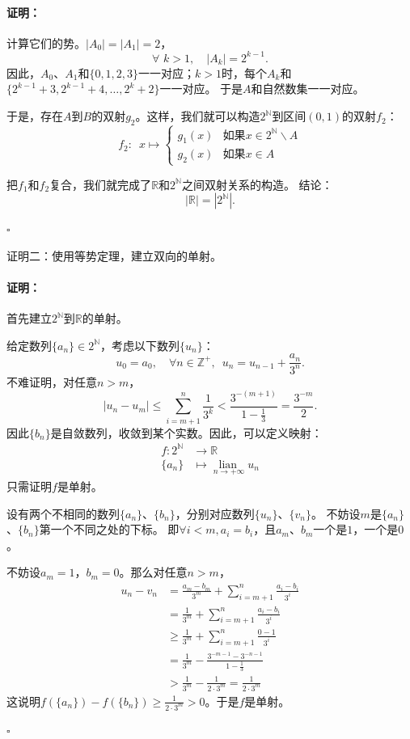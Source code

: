 \documentclass[12pt,UTF8]{ctexbook}
\newcommand{\lian}[1]{
    \underset{#1}{\operatorname{lian}\,}
}
\renewenvironment{proof}{\paragraph{\textbf{证明：}}}{\hfill$\square$}
\begin{document}
\begin{appendix}
\begin{proof}
    计算它们的势。$|A_0| = |A_1| = 2$，
    $$ \forall \,\, k > 1, \quad |A_k| = 2^{k-1}. $$
    因此，$A_0$、$A_1$和$\{0,1,2,3\}$一一对应；$k>1$时，每个$A_k$和$\{2^{k-1}+3,2^{k-1}+4,\ldots, 2^k+2\}$一一对应。
    于是$A$和自然数集一一对应。

    于是，存在$A$到$B$的双射$g_2$。这样，我们就可以构造$2^\mathbb{N}$到区间$(0,1)$的双射$f_2$：
    $$ f_2:\,\,\,x\mapsto \left\{
        \begin{array}{cl}
            g_1(x) & \mbox{如果}x \in 2^\mathbb{N}\backslash A \\
            g_2(x) & \mbox{如果}x \in A 
        \end{array}\right.
    $$

    把$f_1$和$f_2$复合，我们就完成了$\mathbb{R}$和$2^\mathbb{N}$之间双射关系的构造。
    结论：
    $$ |\mathbb{R}| = |2^\mathbb{N}|. $$

\end{proof}

证明二：使用等势定理，建立双向的单射。

\begin{proof}
    首先建立$2^\mathbb{N}$到$\mathbb{R}$的单射。

    给定数列$\{a_n\}\in2^\mathbb{N}$，考虑以下数列$\{u_n\}$：
    $$ u_0 = a_0, \quad  \forall n\in \mathbb{Z}^+ , \,\,\, u_n = u_{n-1} + \frac{a_n}{3^n}. $$
    不难证明，对任意$n>m$，
    $$|u_n - u_m| \leqslant \sum_{i=m+1}^n \frac{1}{3^k} < \frac{3^{-(m+1)}}{1 - \frac{1}{3}} = \frac{3^{-m}}{2}.$$
    因此$\{b_n\}$是自敛数列，收敛到某个实数。因此，可以定义映射：
    \begin{align*}
        f : 2^\mathbb{N} &\rightarrow \mathbb{R}  \\
        \{a_n\} &\mapsto \lian{n\to +\infty} u_n 
    \end{align*}
    只需证明$f$是单射。

    设有两个不相同的数列$\{a_n\}$、$\{b_n\}$，分别对应数列$\{u_n\}$、$\{v_n\}$。
    不妨设$m$是$\{a_n\}$、$\{b_n\}$第一个不同之处的下标。
    即$\forall i<m, a_i = b_i$，且$a_m$、$b_m$一个是$1$，一个是$0$。

    不妨设$a_m = 1$，$b_m = 0$。那么对任意$n>m$，
    \begin{align*}
        u_n - v_n &= \frac{a_m - b_m}{3^m} + \sum_{i=m+1}^n \frac{a_i - b_i}{3^i}  \\
        &= \frac{1}{3^m} + \sum_{i=m+1}^n \frac{a_i - b_i}{3^i}  \\
        &\geqslant \frac{1}{3^m} + \sum_{i=m+1}^n \frac{0 - 1}{3^i}  \\
        &= \frac{1}{3^m} - \frac{3^{-m-1} - 3^{-n-1}}{1 - \frac{1}{3}}  \\
        &> \frac{1}{3^m} - \frac{1}{2\cdot 3^m} = \frac{1}{2\cdot 3^m} 
    \end{align*}
    这说明$f(\{a_n\}) - f(\{b_n\}) \geqslant \frac{1}{2\cdot 3^m} > 0$。于是$f$是单射。


\end{proof}
\end{appendix}
\end{document}
